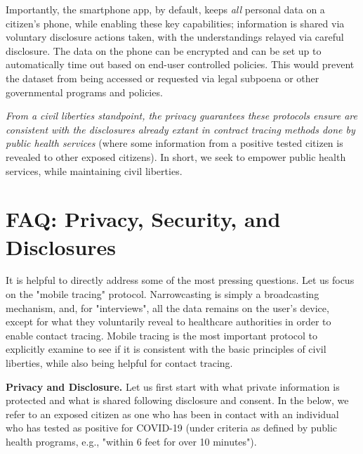 \documentclass{article}
\begin{document}
Importantly, the smartphone app, by default, keeps \emph{all} personal data on a citizen's phone, while enabling these key capabilities; information is shared via voluntary disclosure actions taken, with the understandings relayed via careful disclosure. The data on the phone can be encrypted and can be set up to automatically time out based on end-user controlled policies.  This would prevent the dataset from being accessed or requested via legal subpoena or other governmental programs and policies.

\emph{From a civil liberties standpoint, the privacy guarantees these protocols ensure are consistent with the disclosures already extant in contract tracing methods done by public health services} (where some information from a positive tested citizen is revealed to other exposed citizens). In short, we seek to empower public health services, while maintaining civil liberties.
 
\section{FAQ: Privacy, Security, and Disclosures} \label{sect:FAQ}

It is helpful to directly address some of the most pressing questions. Let us focus on the "mobile tracing" protocol. 
Narrowcasting is simply a broadcasting mechanism, and, for "interviews", all the data remains on the user's device, except for what they voluntarily reveal to healthcare authorities in order to enable contact tracing.  Mobile tracing is the most important protocol to explicitly examine to see if it is consistent with the basic principles of civil liberties, while also being helpful for contact tracing.


\textbf{Privacy and Disclosure.} Let us first start with what private information is protected and what is shared following disclosure and consent. In the below, we refer to an exposed citizen as one who has been in contact with an individual who has tested as positive for COVID-19 (under criteria as defined by public health programs, e.g., "within 6 feet for over 10 minutes").


\end{document}
